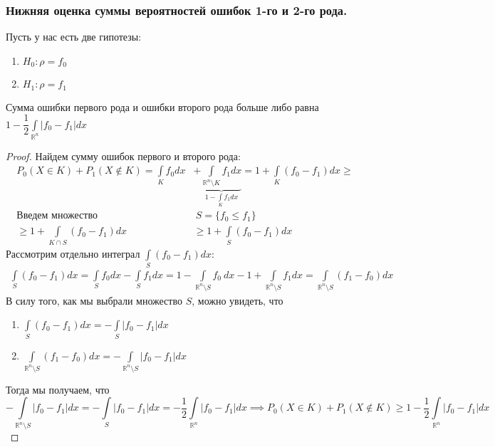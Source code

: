 \subsubsection{Нижняя оценка суммы вероятностей ошибок 1-го и 2-го рода.}
\begin{theorem*}
Пусть у нас есть две гипотезы:
\begin{enumerate}
    \item $H_0:\rho=f_0$
    \item $H_1:\rho=f_1$
\end{enumerate}
Сумма ошибки первого рода и ошибки второго рода больше либо равна $1-\dfrac{1}{2}\int\limits_{\mathbb{R}^n}|f_0-f_1|dx$
\end{theorem*}
\begin{proof}
Найдем сумму ошибок первого и второго рода:
        \begin{align}
            P_{0}(X\in K)+P_{1}(X\notin K) =\int\limits_{K}f_0dx&+\underbrace{\int\limits_{\mathbb{R}^n\setminus K}f_1dx}_{1-\int\limits_K f_1dx}=1+\int\limits_{K}(f_0-f_1)dx\geq
        \\
        \text{Введем множество}&\ S=\{f_0\leq f_1\} 
        \\
        \geq 1+\int\limits_{K\cap S}(f_0-f_1)dx &\geq 1+\int\limits_{S}(f_0-f_1)dx
        \end{align}
Рассмотрим отдельно интеграл $\int\limits_{S}(f_0-f_1)dx$:
\begin{align}
            \int\limits_{S}(f_0-f_1)dx=\int\limits_{S}f_0dx-\int\limits_{S}f_1dx=1-\int\limits_{\mathbb{R}^n\setminus S}f_0\ dx-1+\int\limits_{\mathbb{R}^n\setminus S}f_1dx =\int\limits_{\mathbb{R}^n\setminus S}(f_1-f_0)dx
        \end{align}
В силу того, как мы выбрали множество $S$, можно увидеть, что
\begin{enumerate}
    \item $\int\limits_{S}(f_0-f_1)dx=-\int\limits_{S}|f_0-f_1|dx$
    \item $\int\limits_{\mathbb{R}^n\setminus S}(f_1 -f_0)dx=-\int\limits_{\mathbb{R}^n\setminus S}|f_0-f_1|dx$
\end{enumerate}
Тогда мы получаем, что $$-\int\limits_{\mathbb{R}^n\setminus S}|f_0-f_1|dx=-\int\limits_{S}|f_0-f_1|dx=-\dfrac{1}{2}\int\limits_{\mathbb{R}^n}|f_0-f_1|dx\implies P_{0}(X\in K)+P_{1}(X\notin K)\geq 1-\dfrac{1}{2}\int\limits_{\mathbb{R}^n}|f_0-f_1|dx$$
\end{proof}
